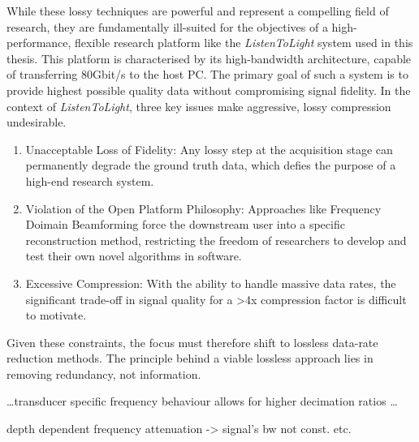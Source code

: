 While these lossy techniques are powerful and represent a compelling field of research, they are fundamentally ill-suited for the objectives of a high-performance, flexible research platform like the \textit{ListenToLight} system used in this thesis. This platform is characterised by its high-bandwidth architecture, capable of transferring 80Gbit/s to the host PC. The primary goal of such a system is to provide highest possible quality data without compromising signal fidelity. In the context of \textit{ListenToLight}, three key issues make aggressive, lossy compression undesirable.

\begin{enumerate}
  \item Unacceptable Loss of Fidelity: Any lossy step at the acquisition stage can permanently degrade the ground truth data, which defies the purpose of a high-end research system. 
  \item Violation of the Open Platform Philosophy: Approaches like Frequency Doimain Beamforming force the downstream user into a specific reconstruction method, restricting the freedom of researchers to develop and test their own novel algorithms in software.
  \item Excessive Compression: With the ability to handle massive data rates, the significant trade-off in signal quality for a >4x compression factor is difficult to motivate.
\end{enumerate}

Given these constraints, the focus must therefore shift to lossless data-rate reduction methods. The principle behind a viable lossless approach lies in removing redundancy, not information. 

\dots transducer specific frequency behaviour allows for higher decimation ratios \dots

depth dependent frequency attenuation -> signal's bw not const. etc.




